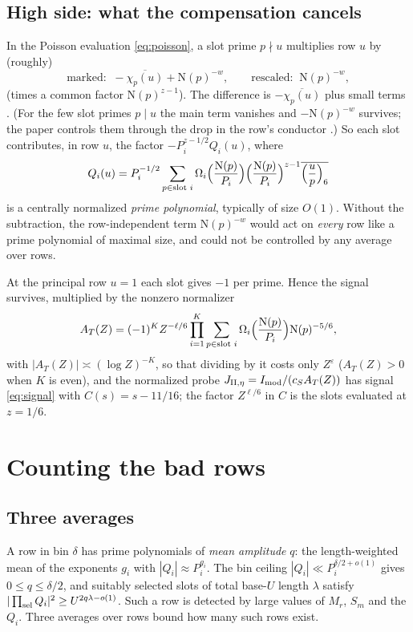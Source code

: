 \documentclass[11pt]{article}
\newcommand{\N}{\mathrm N}
\begin{document}
\subsection{High side: what the compensation cancels}\label{sec:high78}
In the Poisson evaluation \eqref{eq:poisson}, a slot prime $p\nmid u$
multiplies row $u$ by (roughly)
\[
 \text{marked: }\ -\overline{\chi_p(u)}+\N(p)^{-w},\qquad
 \text{rescaled: }\ \N(p)^{-w},
\]
(times a common factor $\N(p)^{z-1}$). The difference is
$-\overline{\chi_p(u)}$ plus small terms
\cite[eq.\ old-eq:5.13b, Prop.\ prop:probe-errors]{OAI78}. (For the few slot primes
$p\mid u$ the main term vanishes and $-\N(p)^{-w}$ survives; the paper controls them through the
drop in the row's conductor \cite[eqs.\ old-eq:5.13d, old-eq:5.13e]{OAI78}.) So each slot
contributes, in row $u$, the factor $-P_i^{z-1/2}Q_i(u)$, where
\begin{equation}\label{eq:amplitude}
 Q_i(u)=P_i^{-1/2}\sum_{p\in\text{slot }i}\Omega_i\Bigl(\frac{\N(p)}{P_i}\Bigr)
 \Bigl(\frac{\N(p)}{P_i}\Bigr)^{z-1}\overline{\Bigl(\frac up\Bigr)_6}
\end{equation}
is a centrally normalized \emph{prime polynomial}, typically of size $O(1)$. Without the subtraction, the
row-independent term $\N(p)^{-w}$ would act on \emph{every} row like a
prime polynomial of maximal size, and could not be controlled by any
average over rows.

At the principal row $u=1$ each slot gives $-1$ per prime. Hence the
signal survives, multiplied by the nonzero normalizer
\[
 A_T(Z)=(-1)^KZ^{-\ell/6}\prod_{i=1}^K\sum_{p\in\text{slot }i}
 \Omega_i\Bigl(\frac{\N(p)}{P_i}\Bigr)\N(p)^{-5/6},
\]
with $|A_T(Z)|\asymp(\log Z)^{-K}$, so that dividing by it costs only $Z^{\varepsilon}$
($A_T(Z)>0$ when $K$ is even), and the normalized probe
$J_{\rm II,\eta}=I_{\rm mod}/(c_SA_T(Z))$ has signal \eqref{eq:signal} with
$C(s)=s-11/16$; the factor $Z^{\ell/6}$ in $C$ is the slots evaluated at $z=1/6$.

\section{Counting the bad rows}\label{sec:counts}

\subsection{Three averages}
A row in bin $\delta$ has prime polynomials of \emph{mean amplitude} $q$: the length-weighted
mean of the exponents $g_i$ with $|Q_i|\approx P_i^{g_i}$. The bin ceiling
$|Q_i|\ll P_i^{\delta/2+o(1)}$ gives $0\le q\le\delta/2$, and suitably selected slots of total
base-$U$ length $\lambda$ satisfy $|\prod_{\rm sel}Q_i|^2\ge U^{2q\lambda-o(1)}$. Such a row
is detected by large values of $M_r$, $S_m$ and the $Q_i$. Three
averages over rows bound how many such rows exist.
\end{document}
